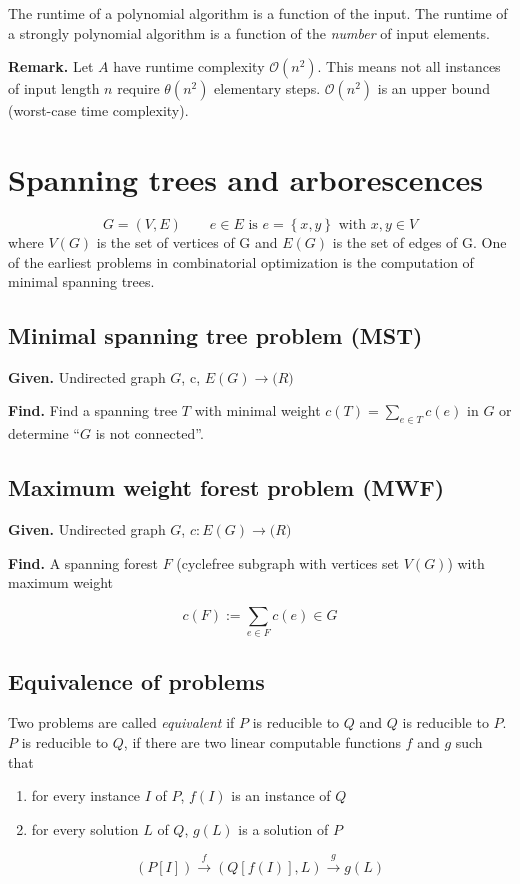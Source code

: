 \documentclass{article}
\newcommand{\set}[1]{\left\{#1\right\}}
\newcommand{\given}[1]{\textbf{Given.} #1\par}
\newcommand{\find}[1]{\textbf{Find.} #1\par}
\begin{document}
The runtime of a polynomial algorithm is a function of the input. The runtime of a strongly polynomial algorithm is a function of the \emph{number} of input elements.

\textbf{Remark.} Let $A$ have runtime complexity $\mathcal{O}(n^2)$. This means not all instances of input length $n$ require $\mathcal{\theta}(n^2)$ elementary steps. $\mathcal{O}(n^2)$ is an upper bound (worst-case time complexity).

\section{Spanning trees and arborescences}
%
\[
  G = (V, E) \qquad e \in E \text{ is } e = \set{x, y} \text{ with } x, y \in V
\]
where $V(G)$ is the set of vertices of G and $E(G)$ is the set of edges of G. One of the earliest problems in combinatorial optimization is the computation of minimal spanning trees.

\subsection{Minimal spanning tree problem (MST)}
%
\given{Undirected graph $G$, c, $E(G) \rightarrow \mathbb(R)$}
\find{Find a spanning tree $T$ with minimal weight $c(T) = \sum_{e \in T} c(e)$ in $G$ or determine ``$G$ is not connected''.}

\subsection{Maximum weight forest problem (MWF)}
%
\given{Undirected graph $G$, $c: E(G) \rightarrow \mathbb(R)$}
\find{A spanning forest $F$ (cyclefree subgraph with vertices set $V(G)$) with maximum weight}
\[
  c(F) := \sum_{e \in F} c(e) \in G
\]

\subsection{Equivalence of problems}
%
Two problems are called \emph{equivalent} if $P$ is reducible to $Q$ and $Q$ is reducible to $P$. $P$ is reducible to $Q$, if there are two linear computable functions $f$ and $g$ such that
\begin{enumerate}
  \item for every instance $I$ of $P$, $f(I)$ is an instance of $Q$
  \item for every solution $L$ of $Q$, $g(L)$ is a solution of $P$
\end{enumerate}
\[
  (P[I]) \xrightarrow{f} (Q[f(I)], L) \xrightarrow{g} g(L)
\]
\end{document}
